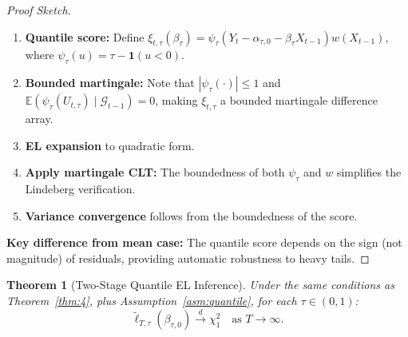 \documentclass[11pt,a4paper]{article}
\newtheorem{theorem}{Theorem}[section]
\theoremstyle{definition}
\theoremstyle{remark}
\begin{document}
\begin{proof}[Proof Sketch]
\begin{enumerate}[leftmargin=*, label=\textbf{\arabic*}.]
    \item \textbf{Quantile score:}
    Define $\xi_{t,\tau}(\beta_\tau) = \psi_\tau(Y_t - \alpha_{\tau,0} - \beta_\tau X_{t-1}) w(X_{t-1})$,
    where $\psi_\tau(u) = \tau - \mathbf{1}(u < 0)$.
    \item \textbf{Bounded martingale:}
    Note that $|\psi_\tau(\cdot)| \leq 1$ and $\mathbb{E}(\psi_\tau(U_{t,\tau}) \mid \mathcal{G}_{t-1}) = 0$,
    making $\xi_{t,\tau}$ a bounded martingale difference array.
    \item \textbf{EL expansion} to quadratic form.
    \item \textbf{Apply martingale CLT:}
    The boundedness of both $\psi_\tau$ and $w$ simplifies the Lindeberg verification.
    \item \textbf{Variance convergence} follows from the boundedness of the score.
\end{enumerate}
\textbf{Key difference from mean case:} The quantile score depends on the sign
(not magnitude) of residuals, providing automatic robustness to heavy tails.
\end{proof}

\begin{theorem}[Two-Stage Quantile EL Inference]\label{thm:5}
Under the same conditions as Theorem~\ref{thm:4}, plus Assumption~\ref{asm:quantile},
for each $\tau \in (0,1)$:
\begin{equation}
    \widetilde{\ell}_{T,\tau}(\beta_{\tau,0}) \xrightarrow{d} \chi^2_1 \quad \text{as } T \to \infty.
\end{equation}
\end{theorem}
\end{document}
